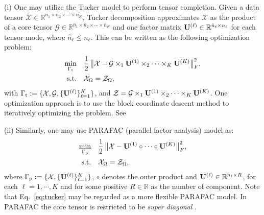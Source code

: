 \documentclass{article}
\newcommand{\R}{{\mathbb R}}
\newcommand{\T}{\mathcal}
\newcommand{\m}[1]{{\bf{#1}}}
\begin{document}
(i)
One may utilize the Tucker model \cite{tucker1964extension} to perform tensor completion. Given a data tensor $\T X\in \mathbb R^{n_1\times n_2\times \cdots \times n_K}$, Tucker decomposition  approximates $\T X$ as the product of a core tensor $\T G\in \mathbb R^{\hat n_1\times \hat n_2\times \cdots\times \hat n_K}$ and one factor matrix $\m U^{(\ell)}\in \mathbb R^{\hat n_\ell\times n_\ell}$ for each tensor mode, where $\hat n_\ell \leq n_\ell$. This can be written as the following optimization problem:
\begin{equation}\label{eq:tucker}
\begin{aligned}
\min\limits_{ \Gamma_{\text t} } \quad  & \frac12\, \big{\|}\T X -\T G\times_1 \m {U}^{(1)}\times_2 \cdots \times_K \m {U}^{(K)}\big{\|}_F^2,\\
\textrm{s.t.} \quad & \m {\T X}_\Omega = {\T{Z}}_\Omega, 
\end{aligned}
\end{equation}
with $\Gamma_{\text t}:=\{\T X, \T G, \{\m{U}^{(\ell)}\}_{\ell=1}^K\}$, and $\T Z= \T G \times_1 \m U^{(1)} \times_2\cdots\times_K \m U^{(K)}$. One optimization approach is to use the block coordinate descent method to iteratively optimizing the problem. See %



(ii)
Similarly, one may use PARAFAC (parallel factor analysis) model as:
\begin{equation}\label{eq:parafac}
\begin{aligned}
\min\limits_{ \Gamma_{\text p} } \quad  & \frac12\, \big{\|}\T X - \m {U}^{(1)}\circ \cdots \circ \m {U}^{(K)}\big{\|}_F^2, \\
\textrm{s.t.} \quad & \m {\T X}_\Omega = {\T{Z}}_\Omega, 
\end{aligned}
\end{equation}
where $\Gamma_{\text p}:=\{\T X,  \{\m{U}^{(\ell)}\}_{\ell=1}^K\}$, $\circ$ denotes the outer product and $\m U^{(\ell)}\in \mathbb R^{n_\ell \times R}$, for each $\ell=1, \cdots, K$ and for some positive $R\in \R$ as the number of component.
Note that Eq.~\eqref{eq:tucker} may be regarded as a more flexible PARAFAC model. In PARAFAC the core tensor is restricted to be \textit{super diagonal} \cite{kolda2009tensor}.
\end{document}
